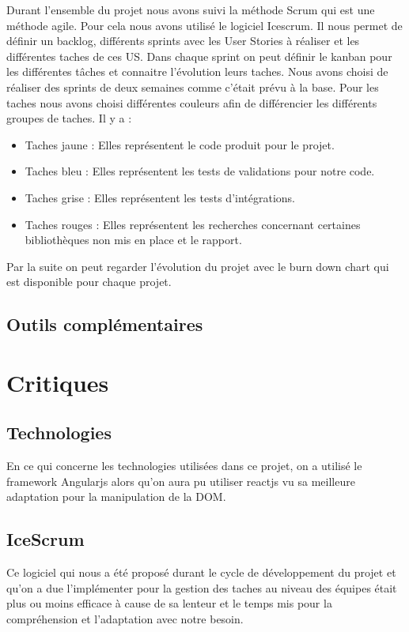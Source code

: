 \documentclass [a4paper,11pt]{article}
\begin{document}
Durant l'ensemble du projet nous avons suivi la méthode Scrum qui est une méthode agile. Pour cela nous avons utilisé le logiciel Icescrum. Il nous permet de définir un backlog, différents sprints avec les User Stories à réaliser et les différentes taches de ces US. Dans chaque sprint on peut définir le kanban pour les différentes tâches et connaitre l'évolution leurs taches. Nous avons choisi de réaliser des sprints de deux semaines comme c'était prévu à la base. 
Pour les taches nous avons choisi différentes couleurs afin de différencier les différents groupes de taches. Il y a :
\begin{itemize}
\item Taches jaune : Elles représentent le code produit pour le projet.
\item Taches bleu : Elles représentent les tests de validations pour notre code.
\item Taches grise : Elles représentent les tests d'intégrations.
\item Taches rouges : Elles représentent les recherches concernant certaines bibliothèques non mis en place et le rapport.
\end{itemize}

Par la suite on peut regarder l'évolution du projet avec le burn down chart qui est disponible pour chaque projet.

\subsection{Outils complémentaires}

\newpage

\newpage

\section{Critiques}

\subsection{Technologies}
En ce qui concerne les technologies utilisées dans ce projet, on a utilisé le framework Angularjs alors qu’on aura pu utiliser reactjs vu sa meilleure adaptation pour la manipulation de la DOM.

\subsection{IceScrum}
Ce logiciel qui nous a été proposé durant le cycle de développement du projet et qu’on a due l’implémenter pour la gestion des taches au niveau des équipes était plus ou moins efficace à cause de sa lenteur et le temps mis pour la compréhension et l’adaptation avec notre besoin.
\end{document}
